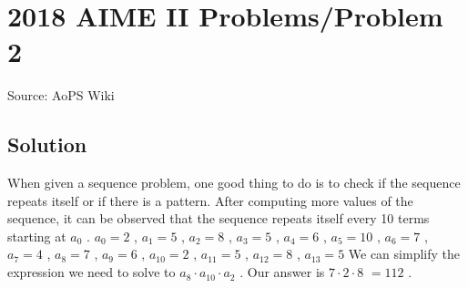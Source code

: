 \documentclass[12pt]{article}
\begin{document}
\section*{{2018 AIME II Problems/Problem 2}}
Source: AoPS Wiki

\subsection*{Solution}
When given a sequence problem, one good thing to do is to check if the sequence repeats itself or if there is a pattern. After computing more values of the sequence, it can be observed that the sequence repeats itself every 10 terms starting at $a_{0}$ . $a_{0} = 2$ , $a_{1} = 5$ , $a_{2} = 8$ , $a_{3} = 5$ , $a_{4} = 6$ , $a_{5} = 10$ , $a_{6} = 7$ , $a_{7} = 4$ , $a_{8} = 7$ , $a_{9} = 6$ , $a_{10} = 2$ , $a_{11} = 5$ , $a_{12} = 8$ , $a_{13} = 5$ We can simplify the expression we need to solve to $a_{8}\cdot a_{10} \cdot a_{2}$ . Our answer is $7 \cdot 2 \cdot 8$ $= \boxed{112}$ .
\end{document}
